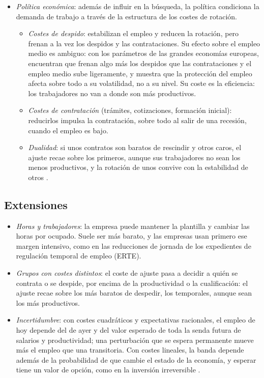 \documentclass[11pt]{article}
\begin{document}
\begin{itemize}
\item \emph{Política económica}: además de influir en la búsqueda, la política condiciona la demanda de trabajo a través de la estructura de los costes de rotación.
  \begin{itemize}
  \item \emph{Costes de despido}: estabilizan el empleo y reducen la rotación, pero frenan a la vez los despidos y las contrataciones. Su efecto sobre el empleo medio es ambiguo: con los parámetros de las grandes economías europeas, \textcite{BentolilaBertola1990Firing} encuentran que frenan algo más los despidos que las contrataciones y el empleo medio sube ligeramente, y \textcite{Bertola1990Job} muestra que la protección del empleo afecta sobre todo a su volatilidad, no a su nivel. Su coste es la eficiencia: los trabajadores no van a donde son más productivos.
  \item \emph{Costes de contratación} (trámites, cotizaciones, formación inicial): reducirlos impulsa la contratación, sobre todo al salir de una recesión, cuando el empleo es bajo.
  \item \emph{Dualidad}: si unos contratos son baratos de rescindir y otros caros, el ajuste recae sobre los primeros, aunque sus trabajadores no sean los menos productivos, y la rotación de unos convive con la estabilidad de otros .
  \end{itemize}
\end{itemize}

\subsection{Extensiones}\label{sec:ajuste-extensiones}

\begin{itemize}
\item \emph{Horas y trabajadores}: la empresa puede mantener la plantilla y cambiar las horas por ocupado. Suele ser más barato, y las empresas usan primero ese margen intensivo, como en las reducciones de jornada de los expedientes de regulación temporal de empleo (ERTE).
\item \emph{Grupos con costes distintos}: el coste de ajuste pasa a decidir a quién se contrata o se despide, por encima de la productividad o la cualificación: el ajuste recae sobre los más baratos de despedir, los temporales, aunque sean los más productivos\nocite{BentolilaDoladoJimeno2012Reforming}.
\item \emph{Incertidumbre}: con costes cuadráticos y expectativas racionales, el empleo de hoy depende del de ayer y del valor esperado de toda la senda futura de salarios y productividad; una perturbación que se espera permanente mueve más el empleo que una transitoria\nocite{Cahuc2014Labor}. Con costes lineales, la banda depende además de la probabilidad de que cambie el estado de la economía, y esperar tiene un valor de opción, como en la inversión irreversible\nocite{CooperHaltiwanger2006Capital} .
\end{itemize}
\end{document}
